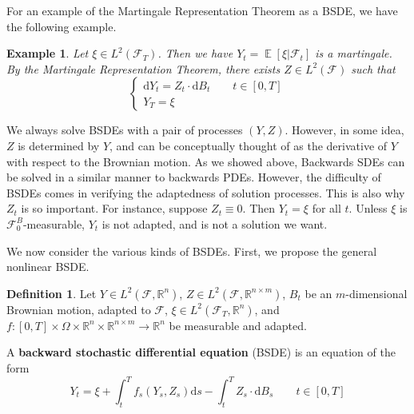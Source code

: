 \documentclass{amsart}
\newcommand{\rr}{\mathbb R}    %
\newcommand{\cF}{\mathcal{F}}
\DeclareMathOperator{\ee}{\mathbb E}
\newtheorem{example}[theorem]{Example}
\theoremstyle{definition}
\newtheorem{definition}{Definition}
\theoremstyle{remark}
\numberwithin{equation}{section}
\begin{document}
For an example of the Martingale Representation Theorem as a BSDE, we have the following example.
\begin{example}
    Let $\xi \in L^2(\cF_T)$. Then we have $Y_t = \ee[\xi | \cF_t]$ is a martingale. By the Martingale Representation Theorem, there exists $Z \in L^2(\cF)$ such that 
    \[
    \begin{cases}
        \mathrm{d}Y_t = Z_t \cdot \mathrm{d} B_t \qquad t \in [0, T] \\
        Y_T = \xi
    \end{cases}
    \]
\end{example}
We always solve BSDEs with a pair of processes $(Y, Z)$. However, in some idea, $Z$ is determined by $Y$, and can be conceptually thought of as the derivative of $Y$ with respect to the Brownian motion.
As we showed above, Backwards SDEs can be solved in a similar manner to backwards PDEs. 
However, the difficulty of BSDEs comes in verifying the adaptedness of solution processes. 
This is also why $Z_t$ is so important. For instance, suppose $Z_t \equiv 0$. Then $Y_t = \xi$ for all $t$. 
Unless $\xi$ is $\cF_0^B$-measurable, $Y_t$ is not adapted, and is not a solution we want.  

We now consider the various kinds of BSDEs. First, we propose the general nonlinear BSDE. 
\begin{definition}
    Let $Y \in L^2(\cF, \rr^n)$, $Z \in L^2(\cF, \rr^{n \times m})$, $B_t$ be an $m$-dimensional Brownian motion, adapted to $\cF$, $\xi \in L^2(\cF_T, \rr^n)$, and $f: [0, T] \times \Omega \times \rr^n \times \rr^{n \times m} \to \rr^n$ be measurable and adapted. 

    A \textbf{backward stochastic differential equation} (BSDE) is an equation of the form
    \begin{equation}
        Y_t = \xi + \int_t^T f_s(Y_s, Z_s) \mathrm{d}s - \int_t^T Z_s \cdot \mathrm{d}B_s \qquad t \in [0, T]
    \end{equation}
\end{definition}
\end{document}
